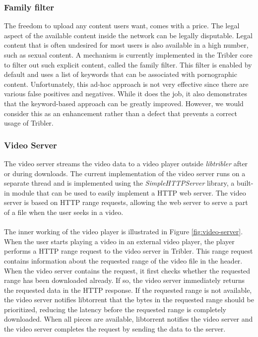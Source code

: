 \subsubsection{\textbf{Family filter}}
The freedom to upload any content users want, comes with a price. The legal aspect of the available content inside the network can be legally disputable. Legal content that is often undesired for most users is also available in a high number, such as sexual content. A mechanism is currently implemented in the Tribler core to filter out such explicit content, called the family filter. This filter is enabled by default and uses a list of keywords that can be associated with pornographic content. Unfortunately, this ad-hoc approach is not very effective since there are various false positives and negatives. While it does the job, it also demonstrates that the keyword-based approach can be greatly improved. However, we would consider this as an enhancement rather than a defect that prevents a correct usage of Tribler.

\subsubsection{\textbf{Video Server}}
\label{subsubsec:video-server}
The video server streams the video data to a video player outside \emph{libtribler} after or during downloads. The current implementation of the video server runs on a separate thread and is implemented using the \emph{SimpleHTTPServer} library, a built-in module that can be used to easily implement a HTTP web server. The video server is based on HTTP range requests, allowing the web server to serve a part of a file when the user seeks in a video.\\\\
The inner working of the video player is illustrated in Figure \ref{fig:video-server}. When the user starts playing a video in an external video player, the player performs a HTTP range request to the video server in Tribler. This range request contains information about the requested range of the video file in the header. When the video server contains the request, it first checks whether the requested range has been downloaded already. If so, the video server immediately returns the requested data in the HTTP response. If the requested range is not available, the video server notifies libtorrent that the  bytes in the requested range should be prioritized, reducing the latency before the requested range is completely downloaded. When all pieces are available, libtorrent notifies the video server and the video server completes the request by sending the data to the server.\\

